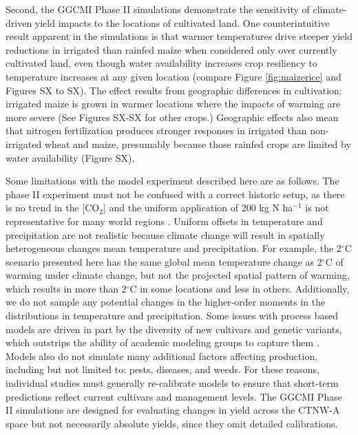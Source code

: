 \documentclass[gmd, manuscript]{copernicus} %
\begin{document}
Second, the GGCMI Phase II simulations demonstrate the sensitivity of climate-driven yield impacts to the locations of cultivated land. 
One counterintuitive result apparent in the simulations is that warmer temperatures drive steeper yield reductions in irrigated than rainfed maize when considered only over currently cultivated land, even though water availability increases crop resiliency to temperature increases at any given location (compare Figure \ref{fig:maizerice} and Figures SX to SX). 
The effect results from geographic differences in cultivation: irrigated maize is grown in warmer locations where the impacts of warming are more severe (See Figures SX-SX for other crops.) 
Geographic effects also mean that nitrogen fertilization produces stronger responses in irrigated than non-irrigated wheat and maize, presumably because those rainfed crops are limited by water availability (Figure SX).

Some limitations with the model experiment described here are as follows.
The phase II experiment must not be confused with a correct historic setup, as there is no trend in the [CO$_2$] and the uniform application of 200 kg N ha$^{-1}$ is not representative for many world regions \citep{Elliott2015}.
Uniform offsets in temperature and precipitation are not realistic because climate change will result in spatially heterogeneous changes mean temperature and precipitation. 
For example, the 2$^{\circ}$C scenario presented here has the same global mean temperature change as 2$^{\circ}$C of warming under climate change, but not the projected spatial pattern of warming, which results in more than 2$^{\circ}$C in some locations and less in others.
Additionally, we do not sample any potential changes in the higher-order moments in the distributions in temperature and precipitation. 
Some issues with process based models are driven in part by the diversity of new cultivars and genetic variants, which outstrips the ability of academic modeling groups to capture them \citep[e.g.][]{JONES2017b}. 
Models also do not simulate many additional factors affecting production, including but not limited to: pests, diseases, and weeds. 
For these reasons, individual studies must generally re-calibrate models to ensure that short-term predictions reflect current cultivars and management levels. 
The GGCMI Phase II simulations are designed for evaluating changes in yield across the CTNW-A space but not necessarily absolute yields, since they omit detailed calibrations. 

\end{document}

